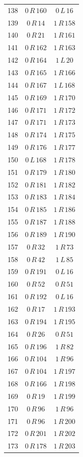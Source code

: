\begin{longtable}{rcc}
138 & $0\,R\,160$ & $0\,L\,16$\\
139 & $0\,R\,14$ & $1\,R\,158$\\
140 & $0\,R\,21$ & $1\,R\,161$\\
141 & $0\,R\,162$ & $1\,R\,163$\\
142 & $0\,R\,164$ & $1\,L\,20$\\
143 & $0\,R\,165$ & $1\,R\,166$\\
144 & $0\,R\,167$ & $1\,L\,168$\\
145 & $0\,R\,169$ & $1\,R\,170$\\
146 & $0\,R\,171$ & $1\,R\,172$\\
147 & $0\,R\,171$ & $1\,R\,173$\\
148 & $0\,R\,174$ & $1\,R\,175$\\
149 & $0\,R\,176$ & $1\,R\,177$\\
150 & $0\,L\,168$ & $1\,R\,178$\\
151 & $0\,R\,179$ & $1\,R\,180$\\
152 & $0\,R\,181$ & $1\,R\,182$\\
153 & $0\,R\,183$ & $1\,R\,184$\\
154 & $0\,R\,185$ & $1\,R\,186$\\
155 & $0\,R\,187$ & $1\,R\,188$\\
156 & $0\,R\,189$ & $1\,R\,190$\\
157 & $0\,R\,32$ & $1\,R\,73$\\
158 & $0\,R\,42$ & $1\,L\,85$\\
159 & $0\,R\,191$ & $0\,L\,16$\\
160 & $0\,R\,52$ & $0\,R\,51$\\
161 & $0\,R\,192$ & $0\,L\,16$\\
162 & $0\,R\,17$ & $1\,R\,193$\\
163 & $0\,R\,194$ & $1\,R\,195$\\
164 & $0\,R\,26$ & $0\,R\,51$\\
165 & $0\,R\,196$ & $1\,R\,82$\\
166 & $0\,R\,104$ & $1\,R\,96$\\
167 & $0\,R\,104$ & $1\,R\,197$\\
168 & $0\,R\,166$ & $1\,R\,198$\\
169 & $0\,R\,19$ & $1\,R\,199$\\
170 & $0\,R\,96$ & $1\,R\,96$\\
171 & $0\,R\,96$ & $1\,R\,200$\\
172 & $0\,R\,201$ & $1\,R\,202$\\
173 & $0\,R\,178$ & $1\,R\,203$\\

\end{longtable}
